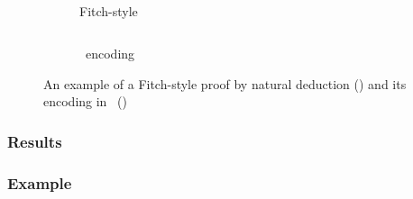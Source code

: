 \documentclass[BA.tex]{subfiles}
\begin{document}
\begin{figure}[!h]
\centering
\begin{subfigure}[t]{0.45\textwidth}
\scriptsize
~\\

\caption[]{Fitch-style}
\label{sf:fs}
\end{subfigure}
\(\qquad\)
\begin{subfigure}[t]{0.45\textwidth}
\scriptsize

\caption[]{\bp\ encoding}
\label{sf:boxin}
\end{subfigure}
\caption[Fitch-style proof and its \bp\ encoding]{An example of a
Fitch-style proof by natural deduction () and its encoding
in \bp\ ()}
\label{boxnfitch}
\end{figure}

\subsubsection{Results}
\begin{figure}[!h]
\begin{subfigure}[t]{0.95\textwidth}
\footnotesize

\end{subfigure}
\caption[]{}
\label{nlprint}
\end{figure}

\begin{figure}[!h]

\caption[]{}
\label{nlprint}
\end{figure}

\begin{figure}[!h]

\caption[]{}
\label{nlprint}
\end{figure}

\subsubsection{Example}
\end{document}

